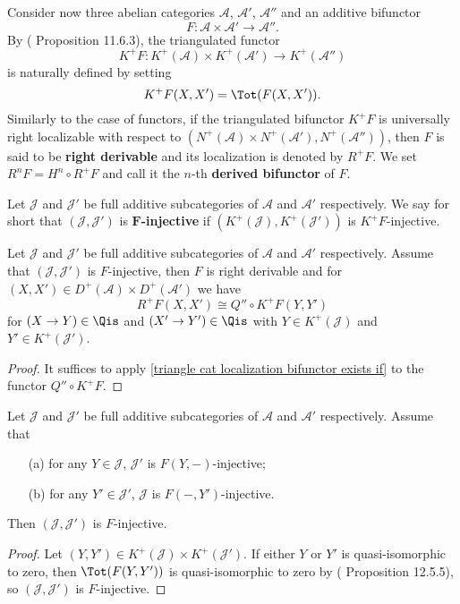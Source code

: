 Consider now three abelian categories $\mathcal{A}$, $\mathcal{A}'$, $\mathcal{A}''$ and an additive bifunctor
\[F:\mathcal{A}\times\mathcal{A}'\to\mathcal{A}''.\]
By (\cite{kashiwara_SAC} Proposition 11.6.3), the triangulated functor
\[K^+F:K^+(\mathcal{A})\times K^+(\mathcal{A}')\to K^+(\mathcal{A}'')\]
is naturally defined by setting
\[K^+F(X,X')=\Tot(F(X,X')).\]
Similarly to the case of functors, if the triangulated bifunctor $K^+F$ is universally right localizable with respect to $(N^+(\mathcal{A})\times N^+(\mathcal{A}'),N^+(\mathcal{A}''))$, then $F$ is said to be \textbf{right derivable} and its localization is denoted by $R^+F$. We set $R^nF=H^n\circ R^+F$ and call it the $n$-th \textbf{derived bifunctor} of $F$.

\begin{definition}
Let $\mathcal{J}$ and $\mathcal{J}'$ be full additive subcategories of $\mathcal{A}$ and $\mathcal{A}'$ respectively. We say for short that $(\mathcal{J},\mathcal{J}')$ is \textbf{$\bm{F}$-injective} if $(K^+(\mathcal{J}),K^+(\mathcal{J}'))$ is $K^+F$-injective.
\end{definition}

\begin{proposition}\label{derived category bifunctor derive exists if}
Let $\mathcal{J}$ and $\mathcal{J}'$ be full additive subcategories of $\mathcal{A}$ and $\mathcal{A}'$ respectively. Assume that $(\mathcal{J},\mathcal{J}')$ is $F$-injective, then $F$ is right derivable and for $(X,X')\in D^+(\mathcal{A})\times D^+(\mathcal{A}')$ we have
\[R^+F(X,X')\cong Q''\circ K^+F(Y,Y')\]
for $(X\to Y)\in\Qis$ and $(X'\to Y')\in\Qis$ with $Y\in K^+(\mathcal{J})$ and $Y'\in K^+(\mathcal{J}')$.
\end{proposition}
\begin{proof}
It suffices to apply \cref{triangle cat localization bifunctor exists if} to the functor $Q''\circ K^+F$.
\end{proof}

\begin{proposition}\label{derived category bifunctor F-injective if separate}
Let $\mathcal{J}$ and $\mathcal{J}'$ be full additive subcategories of $\mathcal{A}$ and $\mathcal{A}'$ respectively. Assume that 
\begin{enumerate}
    \item[(a)] for any $Y\in\mathcal{J}$, $\mathcal{J}'$ is $F(Y,-)$-injective;
    \item[(b)] for any $Y'\in\mathcal{J}'$, $\mathcal{J}$ is $F(-,Y')$-injective.
\end{enumerate}
Then $(\mathcal{J},\mathcal{J}')$ is $F$-injective.
\end{proposition}
\begin{proof}
Let $(Y,Y')\in K^+(\mathcal{J})\times K^+(\mathcal{J}')$. If either $Y$ or $Y'$ is quasi-isomorphic to zero, then $\Tot(F(Y,Y'))$ is quasi-isomorphic to zero by (\cite{kashiwara_SAC} Proposition 12.5.5), so $(\mathcal{J},\mathcal{J}')$ is $F$-injective.
\end{proof}


